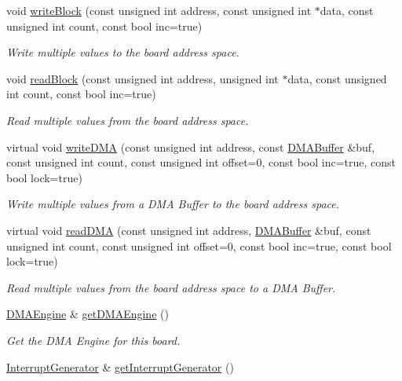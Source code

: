 \begin{CompactItemize}
void \hyperlink{classmprace_1_1ABB_a6}{write\-Block} (const unsigned int address, const unsigned int $\ast$data, const unsigned int count, const bool inc=true)
\begin{CompactList}\small\item\em Write multiple values to the board address space. \item\end{CompactList}\item 
void \hyperlink{classmprace_1_1ABB_a7}{read\-Block} (const unsigned int address, unsigned int $\ast$data, const unsigned int count, const bool inc=true)
\begin{CompactList}\small\item\em Read multiple values from the board address space. \item\end{CompactList}\item 
virtual void \hyperlink{classmprace_1_1ABB_a8}{write\-DMA} (const unsigned int address, const \hyperlink{classmprace_1_1DMABuffer}{DMABuffer} \&buf, const unsigned int count, const unsigned int offset=0, const bool inc=true, const bool lock=true)
\begin{CompactList}\small\item\em Write multiple values from a DMA Buffer to the board address space. \item\end{CompactList}\item 
virtual void \hyperlink{classmprace_1_1ABB_a9}{read\-DMA} (const unsigned int address, \hyperlink{classmprace_1_1DMABuffer}{DMABuffer} \&buf, const unsigned int count, const unsigned int offset=0, const bool inc=true, const bool lock=true)
\begin{CompactList}\small\item\em Read multiple values from the board address space to a DMA Buffer. \item\end{CompactList}\item 
\hyperlink{classmprace_1_1DMAEngine}{DMAEngine} \& \hyperlink{classmprace_1_1ABB_a10}{get\-DMAEngine} ()
\begin{CompactList}\small\item\em Get the DMA Engine for this board. \item\end{CompactList}\item 
\hyperlink{classmprace_1_1InterruptGenerator}{Interrupt\-Generator} \& \hyperlink{classmprace_1_1ABB_a11}{get\-Interrupt\-Generator} ()

\end{CompactItemize}
